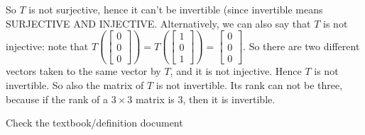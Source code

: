 \begin{SaveQuestion}
\begin{enumerate}
		So $T$ is not surjective, hence it can't be invertible (since invertible means SURJECTIVE AND INJECTIVE. Alternatively, we can also say that $T$ is not injective: note that 
		$T\left(\begin{bmatrix} 0 \\ 0 \\ 0\end{bmatrix}\right) = T\left(\begin{bmatrix} 1 \\ 0 \\ 1\end{bmatrix}\right) = \begin{bmatrix} 0 \\ 0 \\ 0\end{bmatrix}.$ So there are two different vectors taken to the same vector by $T$, and it is not injective. Hence $T$ is not invertible.           
		So also the matrix of $T$ is not invertible. Its rank can not be three, because if the rank of a $3\times 3$ matrix is 3, then it is invertible.
    \end{enumerate}
\end{SaveQuestion}


\begin{SaveQuestion}[
        key=ch3-linearind-definitions-dev,
        prompt={Warm-Up: You should know the definitions of the following terms word by word from your PCE readings. Recite the definitions in your group. \begin{enumerate} \item Kernel and image of a linear transformation \item Injective, surjective and invertibel linear transformations \item A subspace of $\mathbb R^n$. \item A spanning set for a subspace of $\mathbb R^n$. \item A redundant vector in a given set of vectors \item A set of linearly independent vectors in a subspace $V$ \item A set of linearly dependent vectors in a subspace $V$ \end{enumerate} }
][chg-WRIT-matcom] %
    Check the textbook/definition document
\end{SaveQuestion}

